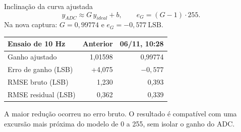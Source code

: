 \begin{block}{Inclinação da curva ajustada}
\[
y_{ADC}\approx G\,y_{ideal}+b,\qquad e_G=(G-1)\cdot255.
\]
Na nova captura: $G=0{,}99774$ e $e_G=\boxed{-0{,}577\ \text{LSB}}$.
\end{block}
\begin{center}
\begin{tabular}{lrr}
\hline
\textbf{Ensaio de 10 Hz} & \textbf{Anterior} & \textbf{06/11, 10:28}\\\hline
Ganho ajustado & 1,01598 & 0,99774\\
Erro de ganho (LSB) & +4,075 & $-0,577$\\
RMSE bruto (LSB) & 1,230 & 0,393\\
RMSE residual (LSB) & 0,362 & 0,339\\\hline
\end{tabular}
\end{center}
\small A maior redução ocorreu no erro bruto. O resultado é compatível com uma excursão mais próxima do modelo de 0 a 255, sem isolar o ganho do ADC.
